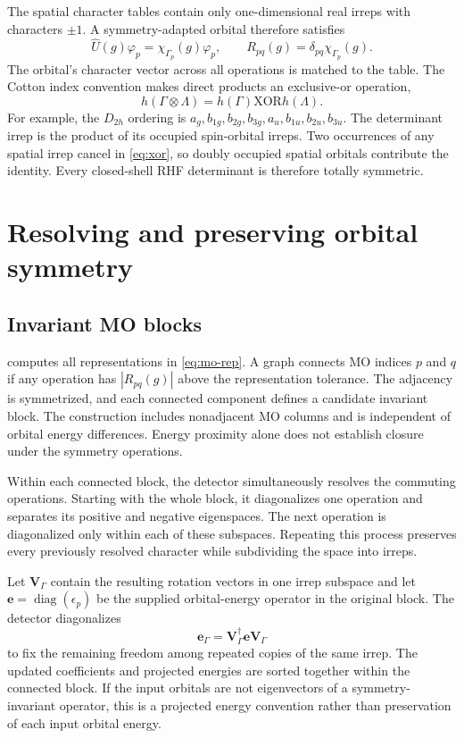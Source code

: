 \documentclass[aip,jcp,preprint,nobibnotes,nofootinbib]{revtex4-1}
\newcommand{\bvec}[1]{\mathbf{#1}}
\newcommand{\code}[1]{\texttt{\detokenize{#1}}}
\begin{document}
The spatial character tables contain only one-dimensional real irreps with
characters $\pm1$. A symmetry-adapted orbital therefore satisfies
\begin{equation}
 \hat U(g)\varphi_p=\chi_{\Gamma_p}(g)\varphi_p,
 \qquad R_{pq}(g)=\delta_{pq}\chi_{\Gamma_p}(g).
 \label{eq:adapted}
\end{equation}
The orbital's character vector across all operations is matched to the table.
The Cotton index convention makes direct products an exclusive-or operation,
\begin{equation}
 h(\Gamma\otimes\Lambda)=h(\Gamma)\mathbin{\mathrm{XOR}}h(\Lambda).
 \label{eq:xor}
\end{equation}
For example, the $D_{2h}$ ordering is
$a_g,b_{1g},b_{2g},b_{3g},a_u,b_{1u},b_{2u},b_{3u}$.
The determinant irrep is the product of its occupied spin-orbital irreps.
Two occurrences of any spatial irrep cancel in \cref{eq:xor}, so doubly
occupied spatial orbitals contribute the identity. Every closed-shell RHF
determinant is therefore totally symmetric.

\section{Resolving and preserving orbital symmetry}
\label{sec:spatial-basis}

\subsection{Invariant MO blocks}

\code{MOSymmetryDetector} computes all representations in
\cref{eq:mo-rep}. A graph connects MO indices $p$ and $q$ if any operation has
$|R_{pq}(g)|$ above the representation tolerance. The adjacency is symmetrized,
and each connected component defines a candidate invariant block. The
construction includes nonadjacent MO columns and is independent of orbital
energy differences. Energy proximity alone does not establish closure under
the symmetry operations.

Within each connected block, the detector simultaneously resolves the
commuting operations. Starting with the whole block, it diagonalizes one
operation and separates its positive and negative eigenspaces. The next
operation is diagonalized only within each of these subspaces. Repeating this
process preserves every previously resolved character while subdividing the
space into irreps.

Let $\bvec{V}_\Gamma$ contain the resulting rotation vectors in one irrep
subspace and let $\bvec{e}=\operatorname{diag}(\epsilon_p)$ be the supplied
orbital-energy operator in the original block. The detector diagonalizes
\begin{equation}
 \bvec{e}_\Gamma=\bvec{V}_\Gamma^\dagger\bvec{e}\bvec{V}_\Gamma
 \label{eq:energy-proxy}
\end{equation}
to fix the remaining freedom among repeated copies of the same irrep. The
updated coefficients and projected energies are sorted together within the
connected block. If the input orbitals are not eigenvectors of a
symmetry-invariant operator, this is a projected energy convention rather
than preservation of each input orbital energy.
\end{document}
